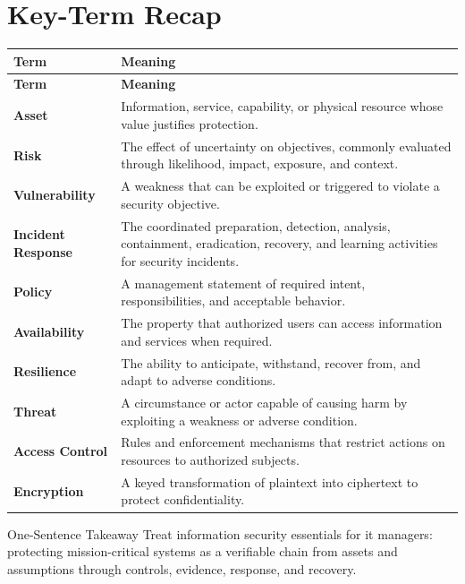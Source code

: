 \documentclass[11pt,letterpaper]{article}
\begin{document}
\section*{Key-Term Recap}
\begin{longtable}{>{\raggedright\arraybackslash}p{}>{\raggedright\arraybackslash}p{}}
\toprule\rowcolor{Navy}\color{white}\textbf{Term} & \color{white}\textbf{Meaning}\\\midrule
\endfirsthead
\toprule\rowcolor{Navy}\color{white}\textbf{Term} & \color{white}\textbf{Meaning}\\\midrule
\endhead
\textbf{Asset} & Information, service, capability, or physical resource whose value justifies protection. \\\midrule
\textbf{Risk} & The effect of uncertainty on objectives, commonly evaluated through likelihood, impact, exposure, and context. \\\midrule
\textbf{Vulnerability} & A weakness that can be exploited or triggered to violate a security objective. \\\midrule
\textbf{Incident Response} & The coordinated preparation, detection, analysis, containment, eradication, recovery, and learning activities for security incidents. \\\midrule
\textbf{Policy} & A management statement of required intent, responsibilities, and acceptable behavior. \\\midrule
\textbf{Availability} & The property that authorized users can access information and services when required. \\\midrule
\textbf{Resilience} & The ability to anticipate, withstand, recover from, and adapt to adverse conditions. \\\midrule
\textbf{Threat} & A circumstance or actor capable of causing harm by exploiting a weakness or adverse condition. \\\midrule
\textbf{Access Control} & Rules and enforcement mechanisms that restrict actions on resources to authorized subjects. \\\midrule
\textbf{Encryption} & A keyed transformation of plaintext into ciphertext to protect confidentiality. \\\midrule
\bottomrule
\end{longtable}
\begin{CornellExamBox}{One-Sentence Takeaway}
Treat information security essentials for it managers: protecting mission-critical systems as a verifiable chain from assets and assumptions through controls, evidence, response, and recovery.
\end{CornellExamBox}
\end{document}
